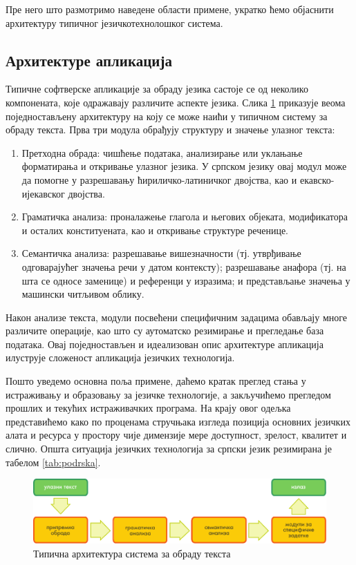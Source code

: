 {\begin{multicols}{2}
Пре него што размотримо наведене  области примене,  укратко ћемо објаснити архитектуру типичног језичкотехнолошког система.

 \subsection {Архитектуре апликација}
   
Типичне софтверске апликације за обраду језика састоје се од неколико компонената, које одражавају различите аспекте језика. Слика \ref{fig:textprocessingarch_sr} приказује веома поједностављену архитектуру на коју се може наићи у типичном систему за обраду текста. Прва три модула обрађују структуру и значење улазног текста:

\begin{enumerate}
\item Претходна обрада: чишћење података, анализирање или уклањање форматирања и откривање улазног језика. У српском језику овај модул може да помогне у разрешавању ћириличко-латиничког двојства, као и екавско-ијекавског двојства. 
\item Граматичка анализа: проналажење глагола и његових објеката, модификатора и осталих конституената, као и откривање структуре реченице. 
\item Семантичка анализа: разрешавање вишезначности (тј. утврђивање одговарајућег значења речи у датом контексту); разрешавање анафора (тј. на шта се односе заменице) и референци у изразима; и представљање значења у машински читљивом облику.
\end{enumerate}

Након анализе текста, модули посвећени специфичним задацима о\-бав\-ља\-ју многе различите операције, као што су аутоматско резимирање и прегледање база података. Овај поједностављен и идеализован опис архитектуре апликација илуструје сложеност апликација језичких технологија. 

Пошто уведемо основна поља примене, даћемо кратак преглед стања у истраживању и образовању за језичке технологије, а закључићемо прегледом прошлих и текућих истраживачких програма. На крају овог одељка представићемо како по проценама стручњака изгледа позиција основних језичких алата и ресурса у простору чије димензије мере доступност, зрелост, квалитет и слично. 
Општа ситуација језичких технологија за српски језик резимирана је табелом \ref{tab:podrska}. 


\begin{figure}[htb]
  \center
  \includegraphics[width=\textwidth]{../_media/serbian/text_processing_app_architecture}
  \caption{Типична архитектура система за обраду текста}
  \label{fig:textprocessingarch_sr}
\end{figure}



\end{multicols}}
